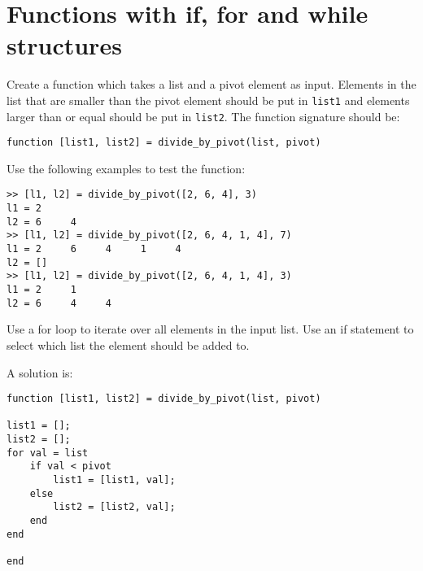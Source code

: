 \section{Functions with if, for and while structures}

\begin{ex}
Create a function which takes a list and a pivot element 
as input. 
Elements in the list that are smaller than the pivot element
should be put in \verb!list1! and elements larger than or equal
should be put in \verb!list2!.
The function signature should be:
\begin{lstlisting}
function [list1, list2] = divide_by_pivot(list, pivot)
\end{lstlisting}
Use the following examples to test the function:
\begin{lstlisting}
>> [l1, l2] = divide_by_pivot([2, 6, 4], 3)
l1 = 2
l2 = 6     4
>> [l1, l2] = divide_by_pivot([2, 6, 4, 1, 4], 7)
l1 = 2     6     4     1     4
l2 = []
>> [l1, l2] = divide_by_pivot([2, 6, 4, 1, 4], 3)
l1 = 2     1
l2 = 6     4     4
\end{lstlisting}
\begin{hint}
Use a for loop to iterate over all elements in the input 
list.
Use an if statement to select which list the element should 
be added to.
\end{hint}
\begin{sol}
A solution is:
\begin{lstlisting}
function [list1, list2] = divide_by_pivot(list, pivot)

list1 = [];
list2 = [];
for val = list
    if val < pivot
        list1 = [list1, val];
    else
        list2 = [list2, val];
    end
end

end
\end{lstlisting}
\end{sol}
\end{ex}


